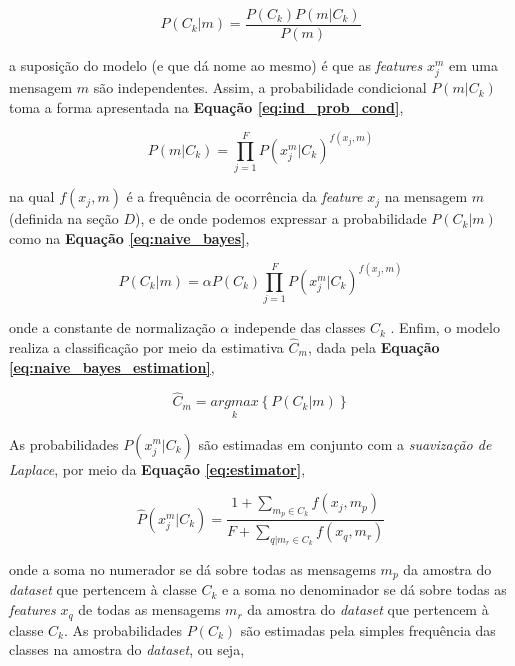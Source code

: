 \documentclass[conference]{IEEEtran}
\begin{document}
\begin{equation} \label{eq:bayes}
P(C_k | m) = \frac{P(C_k) P(m | C_k)}{P(m)}
\end{equation}

\noindent a suposição do modelo (e que dá nome ao mesmo) é que as \textit{features} $x_{j}^m$ em uma mensagem $m$ são independentes. Assim, a probabilidade condicional $P(m | C_k)$ toma a forma apresentada na \textbf{Equação \eqref{eq:ind_prob_cond}},

\begin{equation} \label{eq:ind_prob_cond}
P(m | C_k) = \prod_{j=1}^F P(x_{j}^m | C_k)^{f(x_j, m)}
\end{equation}

\noindent na qual $f(x_j, m)$ é a frequência de ocorrência da \textit{feature} $x_j$ na mensagem $m$ (definida na seção $D$), e de onde podemos expressar a probabilidade $P(C_k | m)$ como na \textbf{Equação \eqref{eq:naive_bayes}},

\begin{equation} \label{eq:naive_bayes}
P(C_k | m) = \alpha P(C_k) \prod_{j=1}^F P(x_{j}^m | C_k)^{f(x_j, m)}
\end{equation}

\noindent onde a constante de normalização $\alpha$ independe das classes $C_k$ \cite{kibriya}. Enfim, o modelo realiza a classificação por meio da estimativa $\hat{C}_m$, dada pela \textbf{Equação \eqref{eq:naive_bayes_estimation}},

\begin{equation} \label{eq:naive_bayes_estimation}
\hat{C}_m = \underset{k} {argmax}\left\{P(C_k | m)\right\}
\end{equation}

\indent As probabilidades $P(x_{j}^m | C_k)$ são estimadas em conjunto com a \textit{suavização de Laplace}, por meio da \textbf{Equação \eqref{eq:estimator}},

\begin{equation} \label{eq:estimator}
\hat{P}(x_{j}^m | C_k) = \frac{1 + \sum\limits_{m_p \in C_k} f\left(x_{j},m_p \right)}{F + \sum\limits_{q | m_r \in C_k} f\left(x_{q}, m_r\right)}
\end{equation}

\noindent onde a soma no numerador se dá sobre todas as mensagems $m_p$ da amostra do \textit{dataset} que pertencem à classe $C_k$  e a soma no denominador se dá sobre todas as \textit{features} $x_{q}$ de todas as mensagems $m_r$ da amostra do \textit{dataset} que pertencem à classe $C_k$. As probabilidades $P(C_k)$ são estimadas pela simples frequência das classes na amostra do \textit{dataset}, ou seja,
\end{document}
